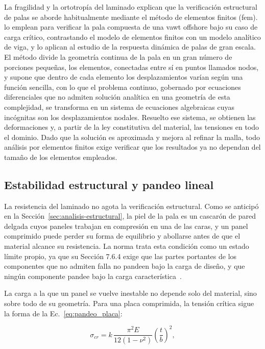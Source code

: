 La fragilidad y la ortotropía del laminado explican que la verificación estructural de palas se aborde habitualmente mediante el método de elementos finitos (\gls{fem}). \textcite{HAND2021} lo emplean para verificar la pala compuesta de una \gls{vawt} offshore bajo su caso de carga crítico, contrastando el modelo de elementos finitos con un modelo analítico de viga, y \textcite{Algolfat2022} lo aplican al estudio de la respuesta dinámica de palas de gran escala. El método divide la geometría continua de la pala en un gran número de porciones pequeñas, los elementos, conectadas entre sí en puntos llamados nodos, y supone que dentro de cada elemento los desplazamientos varían según una función sencilla, con lo que el problema continuo, gobernado por ecuaciones diferenciales que no admiten solución analítica en una geometría de esta complejidad, se transforma en un sistema de ecuaciones algebraicas cuyas incógnitas son los desplazamientos nodales. Resuelto ese sistema, se obtienen las deformaciones y, a partir de la ley constitutiva del material, las tensiones en todo el dominio. Dado que la solución es aproximada y mejora al refinar la malla, todo análisis por elementos finitos exige verificar que los resultados ya no dependan del tamaño de los elementos empleados.

\subsection{Estabilidad estructural y pandeo lineal}
\label{sec:pandeo_teoria}

La resistencia del laminado no agota la verificación estructural. Como se anticipó en la Sección~\ref{sec:analisis-estructural}, la piel de la pala es un cascarón de pared delgada cuyos paneles trabajan en compresión en una de las caras, y un panel comprimido puede perder su forma de equilibrio y abollarse antes de que el material alcance su resistencia. La norma trata esta condición como un estado límite propio, ya que su Sección 7.6.4 exige que las partes portantes de los componentes que no admiten falla no pandeen bajo la carga de diseño, y que ningún componente pandee bajo la carga característica~\parencite{IEC61400-1}.

La carga a la que un panel se vuelve inestable no depende solo del material, sino sobre todo de su geometría. Para una placa comprimida, la tensión crítica sigue la forma de la Ec.~\ref{eq:pandeo_placa}:

\begin{equation}
    \sigma_{cr} = k \, \frac{\pi^2 E}{12\left(1 - \nu^2\right)} \left(\frac{t}{b}\right)^2,
    \label{eq:pandeo_placa}
\end{equation}

